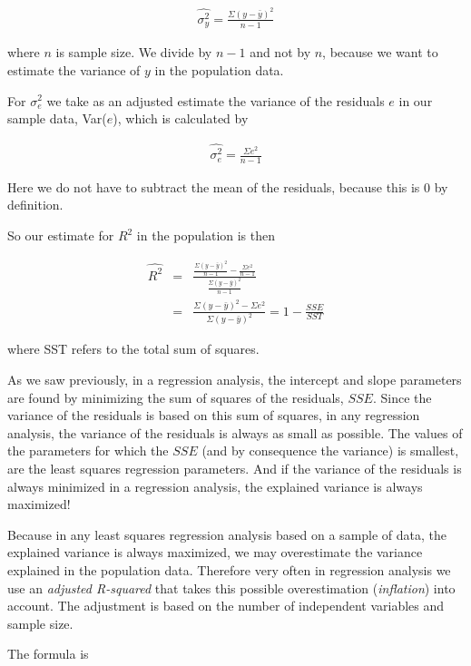 \documentclass[]{book}\usepackage[]{graphicx}\usepackage[]{color}
\begin{document}
\begin{eqnarray}
\widehat{\sigma_y^2} =  \frac{  \Sigma (y-\bar{y})^2  }{n-1}
\end{eqnarray}

where $n$ is sample size. We divide by $n-1$ and not by $n$, because we want to estimate the variance of $y$ in the population data.

For $\sigma_e^2$ we take as an adjusted estimate the variance of the residuals $e$ in our sample data, Var($e$), which is calculated by


\begin{eqnarray}
\widehat{\sigma_e^2} =  \frac{  \Sigma e^2  }{n-1}
\end{eqnarray}

Here we do not have to subtract the mean of the residuals, because this is 0 by definition.

So our estimate for $R^2$ in the population is then


\begin{eqnarray}
\widehat{R^2} &=&  \frac   { \frac{  \Sigma (y-\bar{y})^2  }{n-1}- \frac{  \Sigma e^2  }{n-1}}{\frac{  \Sigma (y-\bar{y})^2  }{n-1}} \nonumber\\
&=& \frac{ \Sigma (y-\bar{y})^2 - \Sigma e^2}{\Sigma (y-\bar{y})^2} = 1 - \frac{SSE}{SST}
\end{eqnarray}

where SST refers to the total sum of squares.

As we saw previously, in a regression analysis, the intercept and slope parameters are found by minimizing the sum of squares of the residuals, $SSE$. Since the variance of the residuals is based on this sum of squares, in any regression analysis, the variance of the residuals is always as small as possible. The values of the parameters for which the $SSE$ (and by consequence the variance) is smallest, are the least squares regression parameters. And if the variance of the residuals is always minimized in a regression analysis, the explained variance is always maximized!

Because in any least squares regression analysis based on a sample of data, the explained variance is always maximized, we may overestimate the variance explained in the population data. Therefore very often in regression analysis we use an \textit{adjusted R-squared} that takes this possible overestimation (\textit{inflation}) into account. The adjustment is based on the number of independent variables and sample size.

The formula is
\end{document}
